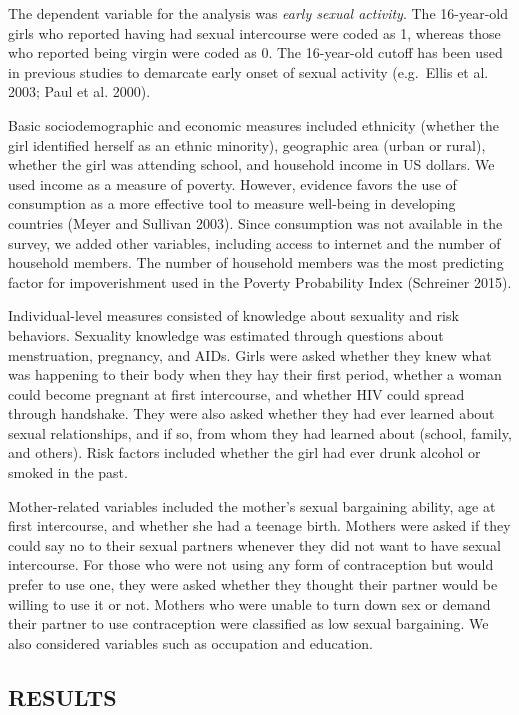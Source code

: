 \documentclass[
]{article}
\begin{document}
The dependent variable for the analysis was \emph{early sexual
activity}. The 16-year-old girls who reported having had sexual
intercourse were coded as 1, whereas those who reported being virgin
were coded as 0. The 16-year-old cutoff has been used in previous
studies to demarcate early onset of sexual activity (e.g.~Ellis et al.
2003; Paul et al. 2000).

Basic sociodemographic and economic measures included ethnicity (whether
the girl identified herself as an ethnic minority), geographic area
(urban or rural), whether the girl was attending school, and household
income in US dollars. We used income as a measure of poverty. However,
evidence favors the use of consumption as a more effective tool to
measure well-being in developing countries (Meyer and Sullivan 2003).
Since consumption was not available in the survey, we added other
variables, including access to internet and the number of household
members. The number of household members was the most predicting factor
for impoverishment used in the Poverty Probability Index (Schreiner
2015).

Individual-level measures consisted of knowledge about sexuality and
risk behaviors. Sexuality knowledge was estimated through questions
about menstruation, pregnancy, and AIDs. Girls were asked whether they
knew what was happening to their body when they hay their first period,
whether a woman could become pregnant at first intercourse, and whether
HIV could spread through handshake. They were also asked whether they
had ever learned about sexual relationships, and if so, from whom they
had learned about (school, family, and others). Risk factors included
whether the girl had ever drunk alcohol or smoked in the past.

Mother-related variables included the mother's sexual bargaining
ability, age at first intercourse, and whether she had a teenage birth.
Mothers were asked if they could say no to their sexual partners
whenever they did not want to have sexual intercourse. For those who
were not using any form of contraception but would prefer to use one,
they were asked whether they thought their partner would be willing to
use it or not. Mothers who were unable to turn down sex or demand their
partner to use contraception were classified as low sexual bargaining.
We also considered variables such as occupation and education.

\hypertarget{results}{%
\subsection{RESULTS}\label{results}}
\end{document}
